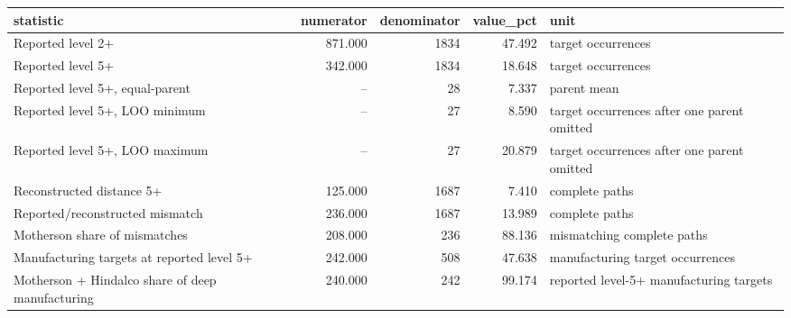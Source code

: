 \begin{tabular}{lrrrl}
\toprule
statistic & numerator & denominator & value\_pct & unit \\
\midrule
Reported level 2+ & 871.000 & 1834 & 47.492 & target occurrences \\
Reported level 5+ & 342.000 & 1834 & 18.648 & target occurrences \\
Reported level 5+, equal-parent & -- & 28 & 7.337 & parent mean \\
Reported level 5+, LOO minimum & -- & 27 & 8.590 & target occurrences after one parent omitted \\
Reported level 5+, LOO maximum & -- & 27 & 20.879 & target occurrences after one parent omitted \\
Reconstructed distance 5+ & 125.000 & 1687 & 7.410 & complete paths \\
Reported/reconstructed mismatch & 236.000 & 1687 & 13.989 & complete paths \\
Motherson share of mismatches & 208.000 & 236 & 88.136 & mismatching complete paths \\
Manufacturing targets at reported level 5+ & 242.000 & 508 & 47.638 & manufacturing target occurrences \\
Motherson + Hindalco share of deep manufacturing & 240.000 & 242 & 99.174 & reported level-5+ manufacturing targets \\
\bottomrule
\end{tabular}
